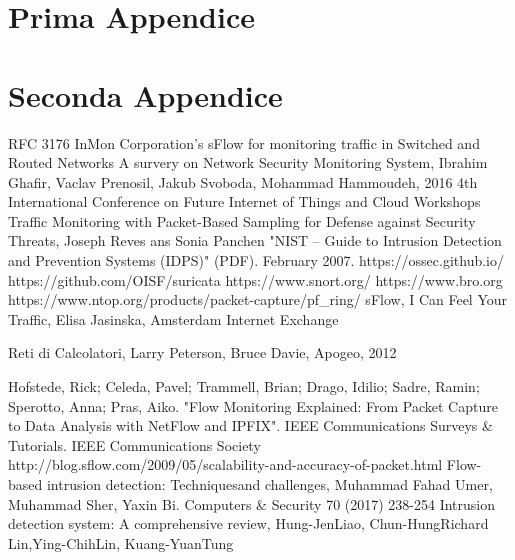 \documentclass[12pt,a4paper,openright,twoside]{report}
\begin{document}
\chapter{Prima Appendice}               %
\chapter{Seconda Appendice}             %
\begin{thebibliography}{90}             %
\rhead[\fancyplain{}{\bfseries \leftmark}]{\fancyplain{}{\bfseries
\thepage}}
 RFC 3176 InMon Corporation's sFlow for monitoring traffic in Switched
and Routed Networks
 A survery on Network Security Monitoring System,
Ibrahim Ghafir, Vaclav Prenosil, Jakub Svoboda, Mohammad Hammoudeh,
 2016 4th International Conference on Future Internet of Things and Cloud Workshops
 Traffic Monitoring with Packet-Based Sampling for Defense against Security Threats, Joseph Reves ans Sonia Panchen
 "NIST – Guide to Intrusion Detection and Prevention Systems (IDPS)" (PDF). February 2007.
 https://ossec.github.io/
 https://github.com/OISF/suricata
 https://www.snort.org/
 https://www.bro.org
 https://www.ntop.org/products/packet-capture/pf\_ring/
 sFlow, I Can Feel Your Traffic, Elisa Jasinska, Amsterdam Internet Exchange


 Reti di Calcolatori, Larry Peterson, Bruce Davie, Apogeo, 2012

 Hofstede, Rick; Celeda, Pavel; Trammell, Brian; Drago, Idilio; Sadre, Ramin; Sperotto, Anna; Pras, Aiko. "Flow Monitoring Explained: From Packet Capture to Data Analysis with NetFlow and IPFIX". IEEE Communications Surveys & Tutorials. IEEE Communications Society
 http://blog.sflow.com/2009/05/scalability-and-accuracy-of-packet.html
 Flow-based intrusion detection: Techniquesand challenges, Muhammad Fahad Umer, Muhammad Sher, Yaxin Bi. Computers \& Security 70 (2017) 238-254
 Intrusion detection system: A comprehensive review, Hung-JenLiao, Chun-HungRichard Lin,Ying-ChihLin, Kuang-YuanTung


\end{thebibliography}
\end{document}
